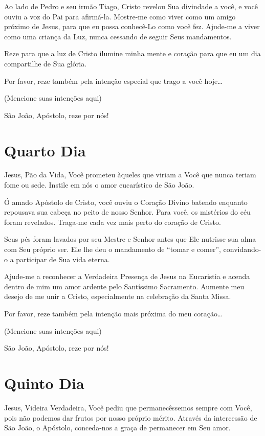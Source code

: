 \documentclass[11pt]{article}
\begin{document}
Ao lado de Pedro e seu irmão Tiago, Cristo revelou Sua divindade a você, e você ouviu a voz do Pai para afirmá-la. Mostre-me como viver como um amigo próximo de Jesus, para que eu possa conhecê-Lo como você fez. Ajude-me a viver como uma criança da Luz, nunca cessando de seguir Seus mandamentos.

Reze para que a luz de Cristo ilumine minha mente e coração para que eu um dia compartilhe de Sua glória.

Por favor, reze também pela intenção especial que trago a você hoje…

(Mencione suas intenções aqui)

São João, Apóstolo, reze por nós!


\section{Quarto Dia}

Jesus, Pão da Vida, Você prometeu àqueles que viriam a Você que nunca teriam fome ou sede. Instile em nós o amor eucarístico de São João.

Ó amado Apóstolo de Cristo, você ouviu o Coração Divino batendo enquanto repousava sua cabeça no peito de nosso Senhor. Para você, os mistérios do céu foram revelados. Traga-me cada vez mais perto do coração de Cristo.

Seus pés foram lavados por seu Mestre e Senhor antes que Ele nutrisse sua alma com Seu próprio ser. Ele lhe deu o mandamento de “tomar e comer”, convidando-o a participar de Sua vida eterna.

Ajude-me a reconhecer a Verdadeira Presença de Jesus na Eucaristia e acenda dentro de mim um amor ardente pelo Santíssimo Sacramento. Aumente meu desejo de me unir a Cristo, especialmente na celebração da Santa Missa.

Por favor, reze também pela intenção mais próxima do meu coração…

(Mencione suas intenções aqui)

São João, Apóstolo, reze por nós!


\section{Quinto Dia}

Jesus, Videira Verdadeira, Você pediu que permanecêssemos sempre com Você, pois não podemos dar frutos por nosso próprio mérito. Através da intercessão de São João, o Apóstolo, conceda-nos a graça de permanecer em Seu amor.
\end{document}
